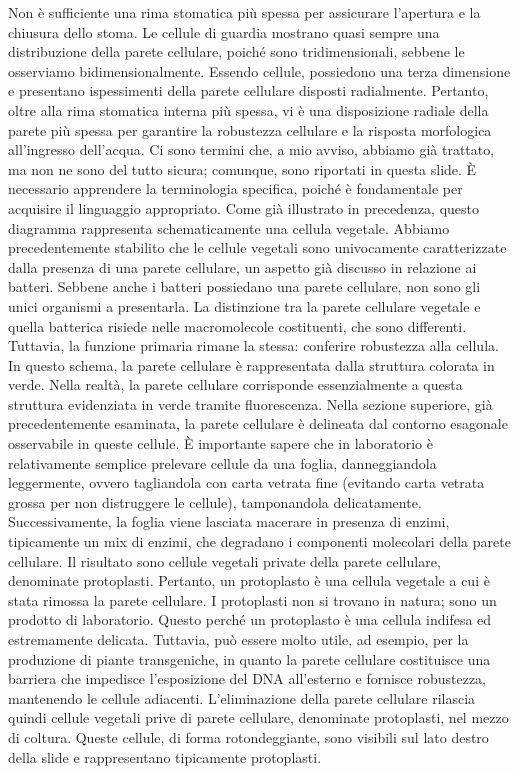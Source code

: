 \documentclass[11pt, a4paper]{article}
\begin{document}
\begin{spacing}{1}
Non è sufficiente una rima stomatica più spessa per assicurare l'apertura e la chiusura dello stoma. Le cellule di guardia mostrano quasi sempre una distribuzione della parete cellulare, poiché sono tridimensionali, sebbene le osserviamo bidimensionalmente. Essendo cellule, possiedono una terza dimensione e presentano ispessimenti della parete cellulare disposti radialmente. Pertanto, oltre alla rima stomatica interna più spessa, vi è una disposizione radiale della parete più spessa per garantire la robustezza cellulare e la risposta morfologica all'ingresso dell'acqua. Ci sono termini che, a mio avviso, abbiamo già trattato, ma non ne sono del tutto sicura; comunque, sono riportati in questa slide.
È necessario apprendere la terminologia specifica, poiché è fondamentale per acquisire il linguaggio appropriato. Come già illustrato in precedenza, questo diagramma rappresenta schematicamente una cellula vegetale. Abbiamo precedentemente stabilito che le cellule vegetali sono univocamente caratterizzate dalla presenza di una parete cellulare, un aspetto già discusso in relazione ai batteri. Sebbene anche i batteri possiedano una parete cellulare, non sono gli unici organismi a presentarla. La distinzione tra la parete cellulare vegetale e quella batterica risiede nelle macromolecole costituenti, che sono differenti. Tuttavia, la funzione primaria rimane la stessa: conferire robustezza alla cellula.
In questo schema, la parete cellulare è rappresentata dalla struttura colorata in verde. Nella realtà, la parete cellulare corrisponde essenzialmente a questa struttura evidenziata in verde tramite fluorescenza. Nella sezione superiore, già precedentemente esaminata, la parete cellulare è delineata dal contorno esagonale osservabile in queste cellule. È importante sapere che in laboratorio è relativamente semplice prelevare cellule da una foglia, danneggiandola leggermente, ovvero tagliandola con carta vetrata fine (evitando carta vetrata grossa per non distruggere le cellule), tamponandola delicatamente. Successivamente, la foglia viene lasciata macerare in presenza di enzimi, tipicamente un mix di enzimi, che degradano i componenti molecolari della parete cellulare. Il risultato sono cellule vegetali private della parete cellulare, denominate protoplasti. Pertanto, un protoplasto è una cellula vegetale a cui è stata rimossa la parete cellulare.
I protoplasti non si trovano in natura; sono un prodotto di laboratorio. Questo perché un protoplasto è una cellula indifesa ed estremamente delicata. Tuttavia, può essere molto utile, ad esempio, per la produzione di piante transgeniche, in quanto la parete cellulare costituisce una barriera che impedisce l'esposizione del DNA all'esterno e fornisce robustezza, mantenendo le cellule adiacenti. L'eliminazione della parete cellulare rilascia quindi cellule vegetali prive di parete cellulare, denominate protoplasti, nel mezzo di coltura. Queste cellule, di forma rotondeggiante, sono visibili sul lato destro della slide e rappresentano tipicamente protoplasti.

\end{spacing}
\end{document}

